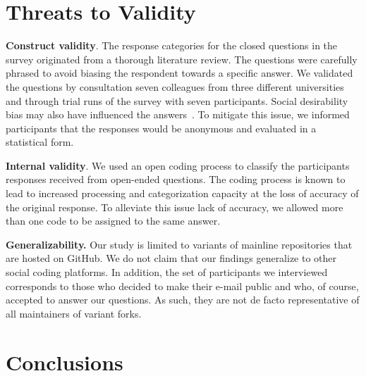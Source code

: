 \section{Threats to Validity}

\noindent \textbf{Construct validity}.
The response categories for the closed questions in the survey originated from a thorough literature review.
The questions were carefully phrased to avoid biasing the respondent towards a specific answer. We validated the questions by consultation seven colleagues from three different universities and through trial runs of the survey with seven participants.
Social desirability bias may also have influenced the answers~\cite{Furnham:1986}. To mitigate this issue, we informed participants that the responses would be anonymous and evaluated in a statistical form.

\noindent \textbf{Internal validity}. We used an open coding process to classify the participants responses received from open-ended questions. The coding process is known to lead to increased processing and categorization capacity at the loss of accuracy of the original response. To alleviate this issue lack of accuracy, we allowed more than one code to be assigned to the same answer.

\noindent \textbf{Generalizability.} Our study is limited to variants of mainline repositories that are hosted on GitHub. We do not claim that our findings generalize to other social coding platforms.
In addition, the set of participants we interviewed corresponds to those who decided to make their e-mail public and who, of course, accepted to answer our questions. As such, they are not de facto representative of all maintainers of variant forks.

\section{Conclusions}


